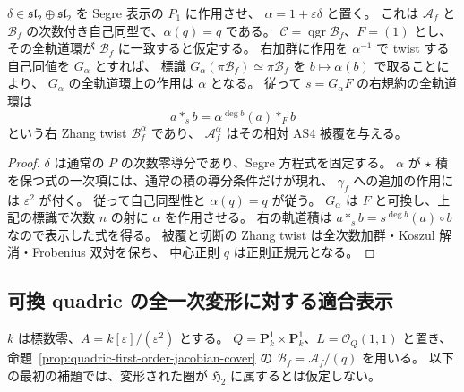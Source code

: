 \begin{lemma}
\label{lem:quadric-first-order-root-twist}
$\delta\in\mathfrak{sl}_2\oplus\mathfrak{sl}_2$ を Segre 表示の $P_1$ に作用させ、
$\alpha=1+\varepsilon\delta$ と置く。
これは $\mathcal A_f$ と $\mathcal B_f$ の次数付き自己同型で、$\alpha(q)=q$ である。
$\mathcal C=\operatorname{qgr}\mathcal B_f$、$F=(1)$ とし、
その全軌道環が $\mathcal B_f$ に一致すると仮定する。
右加群に作用を $\alpha^{-1}$ で twist する自己同値を $G_\alpha$ とすれば、
標識 $G_\alpha(\pi\mathcal B_f)\simeq\pi\mathcal B_f$ を
$b\mapsto\alpha(b)$ で取ることにより、
$G_\alpha$ の全軌道環上の作用は $\alpha$ となる。
従って $s=G_\alpha F$ の右規約の全軌道環は
\[
 a*_{s}b=\alpha^{\deg b}(a)*_Fb
\]
という右 Zhang twist $\mathcal B_f^\alpha$ であり、
$\mathcal A_f^\alpha$ はその相対 AS4 被覆を与える。
\end{lemma}
\begin{proof}
$\delta$ は通常の $P$ の次数零導分であり、Segre 方程式を固定する。
$\alpha$ が $\star$ 積を保つ式の一次項には、通常の積の導分条件だけが現れ、
$\gamma_f$ への追加の作用には $\varepsilon^2$ が付く。
従って自己同型性と $\alpha(q)=q$ が従う。
$G_\alpha$ は $F$ と可換し、上記の標識で次数 $n$ の射に $\alpha$ を作用させる。
右の軌道積は $a*_sb=s^{\deg b}(a)\circ b$ なので表示した式を得る。
被覆と切断の Zhang twist は全次数加群・Koszul 解消・Frobenius 双対を保ち、
中心正則 $q$ は正則正規元となる。
\end{proof}


\subsection{可換 quadric の全一次変形に対する適合表示}
\label{subsec:quadric-first-order-bridge}

$k$ は標数零、$A=k[\varepsilon]/(\varepsilon^2)$ とする。
$Q=\mathbf P^1_k\times\mathbf P^1_k$、$L=\mathcal O_Q(1,1)$ と置き、
命題~\ref{prop:quadric-first-order-jacobian-cover} の
$\mathcal B_f=\mathcal A_f/(q)$ を用いる。
以下の最初の補題では、変形された圏が $\mathfrak H_2$ に属するとは仮定しない。

